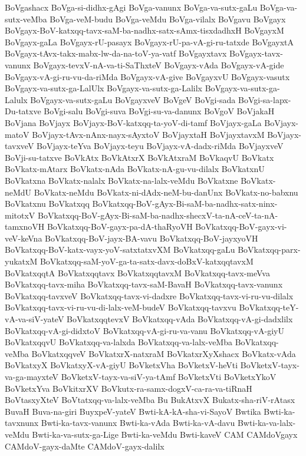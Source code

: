{BoVgashacx
BoVga-si-didhx-gAgi
BoVga-vanunx
BoVga-va-sutx-gaLu
BoVga-va-sutx-veMba
BoVga-veM-budu
BoVga-veMdu
BoVga-vilalx
BoVgavu
BoVgayx
BoVgayx-BoV-katxqq-tavx-saM-ba-nadhx-satx-sAmx-tisxdadhxH
BoVgayxM
BoVgayx-gaLa
BoVgayx-rU-pasayx
BoVgayx-rU-pa-vA-gi-ru-tatxde
BoVgayxtA
BoVgayx-tAvx-takx-mabx-lw-da-na-toV-ya-vatf
BoVgayxtavx
BoVgayx-tavx-vanunx
BoVgayx-tevxV-nA-va-ti-SaThxteV
BoVgayx-vAda
BoVgayx-vA-gide
BoVgayx-vA-gi-ru-vu-da-riMda
BoVgayx-vA-give
BoVgayxvU
BoVgayx-vasutx
BoVgayx-va-sutx-ga-LalUlx
BoVgayx-va-sutx-ga-Lalilx
BoVgayx-va-sutx-ga-Lalulx
BoVgayx-va-sutx-gaLu
BoVgayxveV
BoVgeV
BoVgi-sada
BoVgi-sa-lapx-Du-tatxve
BoVgi-salu
BoVgi-suva
BoVgi-su-va-danunx
BoVgoV
BoVjakaH
BoVjana
BoVjayx
BoVjayx-BoV-katxqq-ta-yoV-di-tamf
BoVjayx-gaLa
BoVjayx-matoV
BoVjayx-tAvx-nAnx-nayx-sAyxtoV
BoVjayxtaH
BoVjayxtavxM
BoVjayx-tavxveV
BoVjayx-teYva
BoVjayx-teyu
BoVjayx-vA-dadx-riMda
BoVjayxveV
BoVji-su-tatxve
BoVkAtx
BoVkAtxrX
BoVkAtxraM
BoVkaqvU
BoVkatx
BoVkatx-mAtarx
BoVkatx-nAda
BoVkatx-nA-gu-vu-dilalx
BoVkatxnU
BoVkatxna
BoVkatx-nalalx
BoVkatx-na-lalx-veMdu
BoVkatxne
BoVkatx-neMdU
BoVkatx-neMdu
BoVkatx-ni-dAdx-neM-bu-danUnx
BoVkatx-no-babxnu
BoVkatxnu
BoVkatxqq
BoVkatxqq-BoV-gAyx-Bi-saM-ba-nadhx-satx-ninx-mitotxV
BoVkatxqq-BoV-gAyx-Bi-saM-ba-nadhx-shecxV-ta-nA-ceV-ta-nA-tamxnoVH
BoVkatxqq-BoV-gayx-pa-dA-thaRyoVH
BoVkatxqq-BoV-gayx-vi-veV-keVna
BoVkatxqq-BoV-jayx-BA-vavu
BoVkatxqq-BoV-jayxyoVH
BoVkatxqq-BoV-katx-vayx-yoV-satxtatxvXM
BoVkatxqq-gaLu
BoVkatxqq-parx-yukatxM
BoVkatxqq-saM-yoV-ga-ta-satx-davx-doBxV-katxqqtavxM
BoVkatxqqtA
BoVkatxqqtavx
BoVkatxqqtavxM
BoVkatxqq-tavx-meVva
BoVkatxqq-tavx-miha
BoVkatxqq-tavx-saM-BavaH
BoVkatxqq-tavx-vanunx
BoVkatxqq-tavxveV
BoVkatxqq-tavx-vi-dadxre
BoVkatxqq-tavx-vi-ru-vu-dilalx
BoVkatxqq-tavx-vi-ru-vu-di-lalx-veM-budeV
BoVkatxqq-tavxvu
BoVkatxqq-teY-vA-va-siV-yateV
BoVkatxqqtevxV
BoVkatxqq-vAda
BoVkatxqq-vA-gi-dadxlilx
BoVkatxqq-vA-gi-didxtoV
BoVkatxqq-vA-gi-ru-va-vanu
BoVkatxqq-vA-giyU
BoVkatxqqvU
BoVkatxqq-va-lalxda
BoVkatxqq-va-lalx-veMba
BoVkatxqq-veMba
BoVkatxqqveV
BoVkatxrX-natxraM
BoVkatxrXyXshacx
BoVkatx-vAda
BoVkatxyX
BoVkatxyX-vA-giyU
BoVketxVha
BoVketxV-heVti
BoVketxV-tayx-va-ga-mayxteV
BoVketxV-tayx-va-siV-ya-tAmf
BoVketxVti
BoVketxYkoV
BoVketxYva
BoVkitxrXV
BoVkutx-ra-samx-dogxV-ca-ra-va-tiRnaH
BoVtasxyXteV
BoVtatxqq-va-lalx-veMba
Bu
BukAtxvX
Bukatx-sha-riV-rAtasx
BuvaH
Buva-na-giri
BuyxpeV-yateV
Bwti-kA-kA-sha-vi-SayoV
Bwtika
Bwti-ka-tavxnunx
Bwti-ka-tavx-vanunx
Bwti-ka-vAda
Bwti-ka-vA-davu
Bwti-ka-va-lalx-veMdu
Bwti-ka-va-sutx-ga-Lige
Bwti-ka-veMdu
Bwti-kaveV
CAM
CAMdoVgayx
CAMdoV-gayx-daMte
CAMdoV-gayx-dalilx
}

